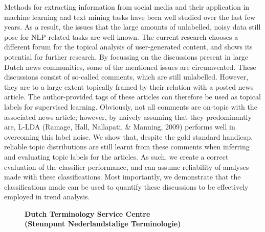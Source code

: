 \documentclass[10pt, a4paper, twopage, headinclude, footinclude, BCOR5mm]{scrartcl}
\begin{document}
\noindent
Methods for extracting information from social media and their application in machine learning and text mining tasks have been well studied over the last few years. As a result, the issues that the large amounts of unlabelled, noisy data still pose for NLP-related tasks are well-known. The current research chooses a different forum for the topical analysis of user-generated content, and shows its potential for further research. By focussing on the discussions present in large Dutch news communities, some of the mentioned issues are circumvented. These discussions consist of so-called comments, which are still unlabelled. However, they are to a large extent topically framed by their relation with a posted news article. The author-provided tags of these articles can therefore be used as topical labels for supervised learning. Obviously, not all comments are on-topic with the associated news article; however, by naively assuming that they predominantly are, L-LDA (Ramage, Hall, Nallapati, \& Manning, 2009) performs well in overcoming this label noise. We show that, despite the gold standard handicap, reliable topic distributions are still learnt from these comments when inferring and evaluating topic labels for the articles. As such, we create a correct evaluation of the classifier performance, and can assume reliability of analyses made with these classifications. Most importantly, we demonstrate that the classifications made can be used to quantify these discussions to be effectively employed in trend analysis.


\newpage

\begin{figure}[t!]
\centering
\large\textbf{Dutch Terminology Service Centre \\ (Steunpunt Nederlandstalige Terminologie)}
\vspace*{0.5cm}
\end{figure}


        \begin{table}[t!]
    \end{table}
\end{document}
